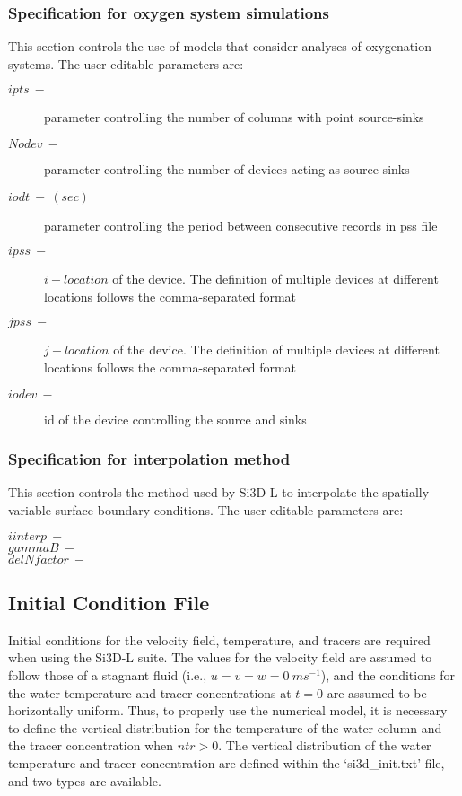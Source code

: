 \subsubsection{Specification for oxygen system simulations}
This section controls the use of models that consider analyses of oxygenation systems. The user-editable parameters are:

\begin{description}
    \item [$ipts\ -$] parameter controlling the number of columns with point source-sinks
    \item [$Nodev\ -$] parameter controlling the number of devices acting as source-sinks
    \item [$iodt\ -\ (sec)$] parameter controlling the period between consecutive records in pss file 
    \item [$ipss\ -$] $i-location$ of the device. The definition of multiple devices at different locations follows the comma-separated format
    \item [$jpss\ -$] $j-location$ of the device. The definition of multiple devices at different locations follows the comma-separated format
    \item [$iodev\ -$] id of the device controlling the source and sinks
\end{description}

\subsubsection{Specification for interpolation method}
This section controls the method used by Si3D-L to interpolate the spatially variable surface boundary conditions. The user-editable parameters are: 
\begin{description}
    \item [$iinterp\ -$]
    \item [$gammaB\ -$]
    \item [$delNfactor\ -$]
\end{description}

\subsection{Initial Condition File}
\label{S:init}
Initial conditions for the velocity field, temperature, and tracers are required when using the Si3D-L suite. The values for the velocity field are assumed to follow those of a stagnant fluid (i.e., $u = v = w = 0\ ms^{-1}$), and the conditions for the water temperature and tracer concentrations at $t = 0$ are assumed to be horizontally uniform. Thus, to properly use the numerical model, it is necessary to define the vertical distribution for the temperature of the water column and the tracer concentration when $ntr > 0$. The vertical distribution of the water temperature and tracer concentration are defined within the `si3d\_init.txt' file, and two types are available. 

